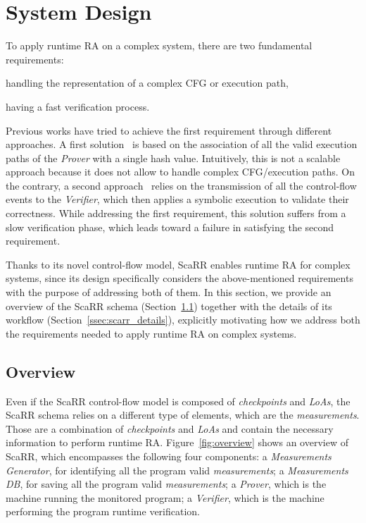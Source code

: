 \section{System Design}
\label{sec:proposal}

To apply runtime RA on a complex system, there are two fundamental 
requirements: 
\begin{enumerate*}[label=(\roman*)]
	\item handling the representation of a complex CFG or execution path,
	\item having a fast verification process.
\end{enumerate*}
Previous works have tried to achieve the first requirement through different 
approaches. A first 
solution~\cite{abera2016c,zeitouni2017atrium,dessouky2017fat} is based on the 
association of all the valid execution paths of the \emph{Prover} with a single 
hash value. 
Intuitively, this is not a scalable approach because it does not allow to 
handle complex CFG/execution paths. 
On the contrary, a second approach~\cite{Dessouky:2018:LLH:3240765.3240821} 
relies on the transmission of all the control-flow events to the 
\emph{Verifier}, 
which then applies a symbolic execution to validate their correctness. While 
addressing the first requirement, this solution suffers from a slow 
verification phase, which leads toward a failure in satisfying the second 
requirement. 

Thanks to its novel control-flow model, ScaRR enables runtime RA for complex 
systems, since its design specifically considers the above-mentioned 
requirements with the purpose of addressing both of them. In this section, we 
provide an overview of the ScaRR schema (Section~\ref{ssec:scarr_overview}) 
together with the details of its workflow (Section~\ref{ssec:scarr_details}), 
explicitly motivating how we address both the requirements needed to apply 
runtime RA on complex systems. 

\subsection{Overview}
\label{ssec:scarr_overview}
Even if the ScaRR control-flow model is composed of \emph{checkpoints} and 
\emph{LoAs}, the ScaRR schema relies on a different type of elements, which are 
the \emph{measurements}. Those are a combination of \emph{checkpoints} and 
\emph{LoAs} and contain the necessary information to perform runtime RA. 
Figure~\ref{fig:overview} shows an overview of ScaRR, which encompasses the 
following four components: a \emph{Measurements Generator}, for identifying all 
the program valid \emph{measurements}; 
a \emph{Measurements DB}, for saving all the program valid \emph{measurements};
a \emph{Prover}, which is the machine running the monitored program;
a \emph{Verifier}, which is the machine performing the program runtime 
verification. 

